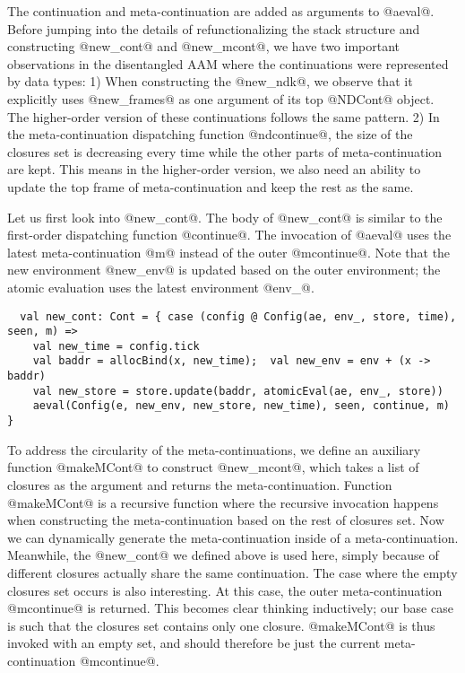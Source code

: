\documentclass[acmsmall, screen]{acmart}\settopmatter{}
\begin{document}
The continuation and meta-continuation are added as arguments to @aeval@.
Before jumping into the details of refunctionalizing the stack structure and constructing
@new_cont@ and @new_mcont@, we have two important observations in the disentangled AAM
where the continuations were represented by data types:
1) When constructing the @new_ndk@, we observe that it explicitly uses @new_frames@ as one
argument of its top @NDCont@ object. The higher-order version of these continuations follows
the same pattern.
2) In the meta-continuation dispatching function @ndcontinue@, the size of the closures set is
decreasing every time while the other parts of meta-continuation are kept. This means in
the higher-order version, we also need an ability to update the top frame of meta-continuation
and keep the rest as the same.

Let us first look into @new_cont@. The body of @new_cont@ is similar to the first-order dispatching
function @continue@. The invocation of @aeval@ uses the latest
meta-continuation @m@ instead of the outer @mcontinue@. Note that the
new environment @new_env@ is updated based on the outer environment;
the atomic evaluation uses the latest environment @env_@.

\begin{lstlisting}
  val new_cont: Cont = { case (config @ Config(ae, env_, store, time), seen, m) =>
    val new_time = config.tick
    val baddr = allocBind(x, new_time);  val new_env = env + (x -> baddr)
    val new_store = store.update(baddr, atomicEval(ae, env_, store))
    aeval(Config(e, new_env, new_store, new_time), seen, continue, m) }
\end{lstlisting}

To address the circularity of the meta-continuations, we define an auxiliary function
@makeMCont@ to construct @new_mcont@, which takes a list of closures as the argument and returns the meta-continuation.
Function @makeMCont@ is a recursive function where the recursive invocation happens when
constructing the meta-continuation based on the rest of closures set.
Now we can dynamically generate the meta-continuation inside of a meta-continuation.
Meanwhile, the @new_cont@ we defined above is used here, simply because of different closures
actually share the same continuation.
The case where the empty closures set occurs is also interesting. At this case,
the outer meta-continuation @mcontinue@ is returned.
This becomes clear thinking inductively; our base case is such that the closures set contains only one
closure. @makeMCont@ is thus invoked with an empty set, and should therefore be just the
current meta-continuation @mcontinue@.
\end{document}
